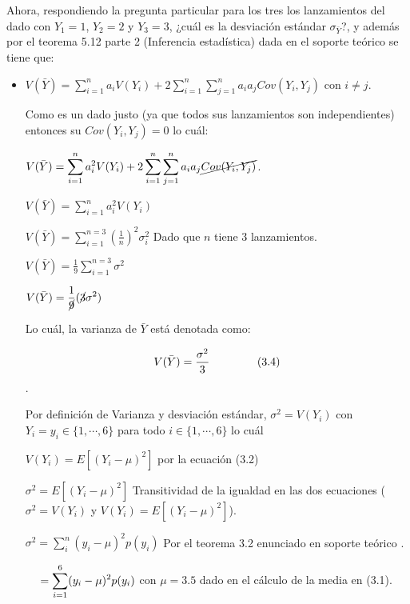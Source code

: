 \documentclass[
]{article}
\begin{document}
Ahora, respondiendo la pregunta particular para los tres los lanzamientos del dado con $Y_{1} = 1$, $Y_{2} = 2$ y $Y_{3} = 3 $, ¿cuál es la desviación estándar $\displaystyle \sigma_{\bar{Y}}$?,  y además por el teorema 5.12 parte 2 (Inferencia estadística) dada en el soporte teórico se tiene que:

\begin{itemize}

  
  \item $\displaystyle V(\bar{Y}) = \sum_{i=1}^{n}a_{i}V(Y_i) + 2\sum_{i=1}^{n} \sum_{j=1}^{n}a_{i}a_{j} Cov(Y_{i},Y_{j})$ con $i \not = j$.
  
  Como es un dado justo (ya que todos sus lanzamientos son independientes) entonces su $Cov(Y_{i},Y_{j})=0$ lo cuál:
  
  $\displaystyle V(\bar{Y}) = \sum_{i=1}^{n}a_{i}^{2}V(Y_i) + 2\sum_{i=1}^{n} \sum_{j=1}^{n}a_{i}a_{j} \cancel{Cov(Y_{i},Y_{j})}$. 
  
  $\displaystyle V(\bar{Y}) = \sum_{i=1}^{n}a_{i}^{2}V(Y_i)$
  
  $\displaystyle V(\bar{Y}) = \sum_{i=1}^{n=3}(\frac{1}{n})^{2}\sigma_{i}^{2}$ Dado que $n$ tiene 3 lanzamientos.
  
  $\displaystyle V(\bar{Y}) = \frac{1}{9}\sum_{i=1}^{n=3}\sigma^{2}$
  
  $\displaystyle V(\bar{Y}) = \frac{1}{\cancel{9}}(\cancel{3}\sigma^{2})$ 
 
  \begin{caja}
  
  Lo cuál, la varianza de $\bar{Y}$ está denotada como:
  
   $$\displaystyle V(\bar{Y}) = \frac{\sigma^{2}}{3} \hspace{1.5cm} (3.4)$$. 
  \end{caja}
 
  Por definición de Varianza y desviación estándar,  $\sigma^2 = V(Y_i)$ con $Y_i = y_i \in \{1,\cdots, 6 \}$ para todo $i \in \{1,\cdots, 6 \}$ lo cuál  
  
  
  $V(Y_i) = E[(Y_i-\mu)^2] $ por la ecuación (3.2)
  
  $\sigma^2 = E[(Y_i-\mu)^2] $ Transitividad de la igualdad en las dos ecuaciones ($\sigma^2 = V(Y_i)$ y   $V(Y_i) = E[(Y_i-\mu)^2]$).
  
  $\sigma^2 = \displaystyle \sum_{i}^{n} (y_{i}-\mu)^2p(y_{i})$ Por el teorema 3.2 enunciado en soporte teórico .
  
  $\hspace{0.45cm} = \displaystyle \sum_{i=1}^{6} (y_{i}-\mu)^2p(y_{i}) $ con $\mu = 3.5$ dado en el cálculo de la media en (3.1).
  

\end{itemize}
\end{document}
